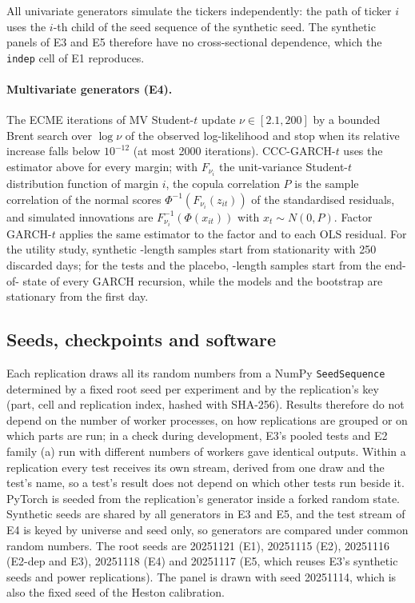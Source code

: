 All univariate generators simulate the tickers independently: the path of ticker $i$ uses the
$i$-th child of the seed sequence of the synthetic seed. The synthetic panels of E3 and E5
therefore have no cross-sectional dependence, which the \texttt{indep} cell of E1 reproduces.

\paragraph{Multivariate generators (E4).}
The ECME iterations of MV Student-$t$ \citep{liu1995ml} update $\nu\in[2.1,200]$ by a bounded
Brent search over $\log\nu$ of the observed log-likelihood and stop when its relative increase
falls below $10^{-12}$ (at most 2000 iterations). CCC-GARCH-$t$ uses the \GARCHt{} estimator
above for every margin; with $F_{\nu_i}$ the unit-variance Student-$t$ distribution function of
margin $i$, the copula correlation $P$ is the sample correlation of the normal scores
$\Phi^{-1}(F_{\nu_i}(z_{it}))$ of the standardised residuals, and simulated innovations are
$F_{\nu_i}^{-1}(\Phi(x_{it}))$ with $x_t\sim N(0,P)$. Factor GARCH-$t$ applies the same
\GARCHt{} estimator to the factor and to each OLS residual. For the utility study, synthetic \TRAIN{}-length samples start from stationarity with 250
discarded days; for the tests and the placebo, \TEST{}-length samples start from the
end-of-\TRAIN{} state of every GARCH recursion, while the \iid{} models and the bootstrap are
stationary from the first day.

\subsection{Seeds, checkpoints and software}\label{app:impl-seeds}

Each replication draws all its random numbers from a NumPy \texttt{SeedSequence}
\citep{harris_2020_array} determined by a fixed root seed per experiment and by the
replication's key (part, cell and replication index, hashed with SHA-256). Results therefore do
not depend on the number of worker processes, on how replications are grouped or on which parts
are run; in a check during development, E3's pooled tests and E2 family (a) run with different
numbers of workers gave identical outputs. Within a replication every test receives its own stream, derived from one
draw and the test's name, so a test's result does not depend on which other tests run beside
it. PyTorch is seeded from the replication's generator inside a forked random state. Synthetic
seeds are shared by all generators in E3 and E5, and the test stream of E4 is keyed by universe
and seed only, so generators are compared under common random numbers. The root seeds are
20251121 (E1), 20251115 (E2), 20251116 (E2-dep and E3), 20251118 (E4) and 20251117 (E5, which
reuses E3's synthetic seeds and power replications). The panel is drawn with seed 20251114,
which is also the fixed seed of the Heston calibration.

